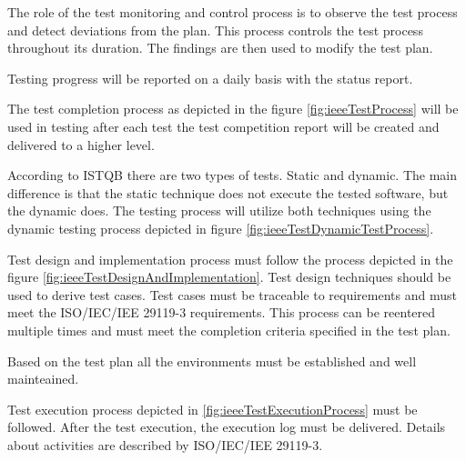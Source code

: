 The role of the test monitoring and control process is to observe the test process and detect deviations from the plan. This process controls the test process throughout its duration. The findings are then used to modify the test plan.

Testing progress will be reported on a daily basis with the status report.

The test completion process as depicted in the figure \ref{fig:ieeeTestProcess} will be used in testing after each test the test competition report will be created and delivered to a higher level.


According to ISTQB \cite{FoundationOfSoftwareTesting} there are two types of tests. Static and dynamic. The main difference is that the static technique does not execute the tested software, but the dynamic does. The testing process will utilize both techniques using the dynamic testing process depicted in figure \ref{fig:ieeeTestDynamicTestProcess}.


Test design and implementation process must follow the process depicted in the figure \ref{fig:ieeeTestDesignAndImplementation}. Test design techniques should be used to derive test cases. Test cases must be traceable to requirements and must meet the ISO/IEC/IEE 29119-3 requirements. This process can be reentered multiple times and must meet the completion criteria specified in the test plan.


Based on the test plan all the environments must be established and well mainteained.

Test execution process depicted in \ref{fig:ieeeTestExecutionProcess} must be followed. After the test execution, the execution log must be delivered. Details about activities are described by ISO/IEC/IEE 29119-3.


